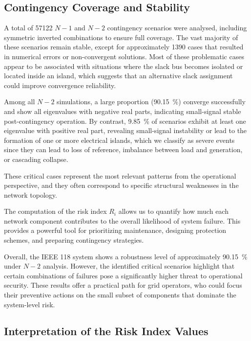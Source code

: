 \documentclass[journal]{IEEEtran}
\begin{document}
\subsection{Contingency Coverage and Stability}

A total of \num{57122} $N-1$ and $N-2$ contingency scenarios were analysed, including symmetric inverted combinations to ensure full coverage. The vast majority of these scenarios remain stable, except for approximately 1390 cases that resulted in numerical errors or non-convergent solutions. Most of these problematic cases appear to be associated with situations where the slack bus becomes isolated or located inside an island, which suggests that an alternative slack assignment could improve convergence reliability.

Among all $N-2$ simulations, a large proportion (\qty{90.15}{\percent}) converge successfully and show all eigenvalues with negative real parts, indicating small-signal stable post-contingency operation. By contrast, \qty{9.85}{\percent}  of scenarios exhibit at least one eigenvalue with positive real part, revealing small-signal instability or lead to the formation of one or more electrical islands, which we classify as severe events since they can lead to loss of reference, imbalance between load and generation, or cascading collapse.

These critical cases represent the most relevant patterns from the operational perspective, and they often correspond to specific structural weaknesses in the network topology.


The computation of the risk index $R_i$ allows us to quantify how much each network component contributes to the overall likelihood of system failure. This provides a powerful tool for prioritizing maintenance, designing protection schemes, and preparing contingency strategies.

Overall, the IEEE 118 system shows a robustness level of approximately \qty{90.15}{\percent} under $N-2$ analysis. However, the identified critical scenarios highlight that certain combinations of failures pose a significantly higher threat to operational security. These results offer a practical path for grid operators, who could focus their preventive actions on the small subset of components that dominate the system-level risk.

\subsection{Interpretation of the Risk Index Values}
\end{document}
